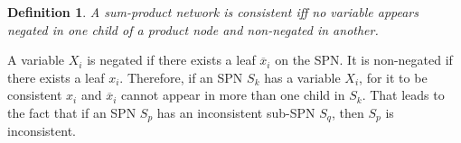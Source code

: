 \documentclass[a4paper,10pt]{article}
\theoremstyle{plain}
\newtheorem*{spn-def}{Definition}
\begin{document}
\begin{figure}[h]
\end{figure}

\begin{spn-def}
  A sum-product network is consistent iff no variable appears negated in one child of a product
  node and non-negated in another.
\end{spn-def}

A variable $X_i$ is negated if there exists a leaf $\overline{x}_i$ on the SPN\@. It is non-negated
if there exists a leaf $x_i$. Therefore, if an SPN $S_k$ has a variable $X_i$, for it to be
consistent $x_i$ and $\overline{x}_i$ cannot appear in more than one child in $S_k$. That leads to
the fact that if an SPN $S_p$ has an inconsistent sub-SPN $S_q$, then $S_p$ is inconsistent.

\begin{figure}[h]
\end{figure}
\end{document}
